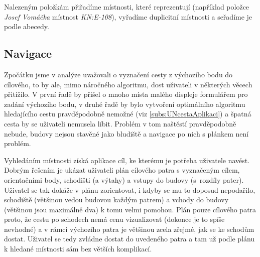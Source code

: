 Nalezeným položkám přiřadíme místnosti, které reprezentují (například položce \emph{Josef Vomáčka} místnost \emph{KN:E-108}), vyřadíme duplicitní místnosti a seřadíme je podle abecedy.

\subsection{Navigace}
Zpočátku jsme v analýze uvažovali o vyznačení cesty z výchozího bodu do cílového, to by ale, mimo náročného algoritmu, dost uživateli v některých věcech přitížilo. V první řadě by přišel o mnoho místa malého displeje formulářem pro zadání výchozího bodu, v druhé řadě by bylo vytvoření optimálního algoritmu hledajícího cestu pravděpodobně nemožné (viz \ref{subs:UNcestaAplikaci}) a špatná cesta by se uživateli nemusela líbit. Problém v tom naštěstí pravděpodobně nebude, budovy nejsou stavěné jako bludiště a navigace po nich s plánkem není problém.

Vyhledáním místnosti získá aplikace cíl, ke kterému je potřeba uživatele navést. Dobrým řešením je ukázat uživateli plán cílového patra s vyznačeným cílem, orientačními body, schodišti (a výtahy) a vstupy do budovy (s~rozdíly pater). Uživatel se tak dokáže v plánu zorientovat, i kdyby se mu to doposud nepodařilo, schodiště (většinou vedou budovou každým patrem) a vchody do budovy (většinou jsou maximálně dva) k tomu velmi pomohou. Plán pouze cílového patra proto, že cestu po schodech nemá cenu vizualizovat (dokonce je to spíše nevhodné) a v rámci výchozího patra je většinou zcela zřejmé, jak se ke schodům dostat. Uživatel se tedy zvládne dostat do uvedeného patra a tam už podle plánu k hledané místnosti sám bez větších komplikací.
